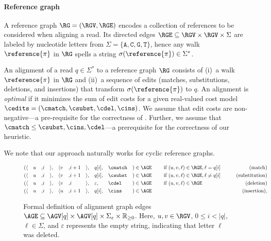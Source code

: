 \paragraph{Reference graph}
%
A reference graph $\RG=(\RGV,\RGE)$ encodes a collection of references to be
considered when aligning a read. Its directed edges $\RGE \subseteq \RGV \times
\RGV \times \Sigma$ are labeled by nucleotide letters from $\Sigma =
\{\texttt{A},\texttt{C},\texttt{G},\texttt{T}\}$, hence any walk
$\reference{\pi}$ in $\RG$ spells a string $\sigma(\reference{\pi}) \in
\Sigma^*$.

An alignment of a read $q \in \Sigma^*$ to a reference graph $\RG$ consists of
(i)~a walk $\reference{\pi}$ in $\RG$ and (ii)~a sequence of edits (matches,
substitutions, deletions, and insertions) that transform
$\sigma(\reference{\pi})$ to $q$. An alignment is \emph{optimal} if it minimizes
the sum of edit costs for a given real-valued cost model $\cedits = (\cmatch,
\csubst,\cdel, \cins)$.
%
We assume that edit costs are non-negative---a pre-requisite for the correctness
of \A. Further, we assume that $\cmatch \leq \csubst, \cins, \cdel$---a
prerequisite for the correctness of our heuristic.

We note that our approach naturally works for cyclic reference graphs.

\begin{figure}[H]
	\begin{alignat*}{20}
		(
			&\langle&& u &,& i   &\rangle&,
			&\langle&  v &,& i+1 &\rangle&,
			&&q[i],
			&&\cmatch
		&)&\in \AGE
		&& \quad \text{ if } (u,v,\ell) \in \RGE, \ell = q[i] & \qquad \text{(match)}\\
		(
			&\langle&& u &,& i   &\rangle&,
			&\langle&  v &,& i+1 &\rangle&,
			&&q[i],
			&&\csubst
		&) &\in \AGE
		&& \quad \text{ if } (u,v,\ell) \in \RGE, \ell \neq q[i] & \qquad \text{(substitution)}\\
		(
			&\langle&& u &,& i &\rangle&,
			&\langle&  v &,& i &\rangle&,
			&&\varepsilon,
			&&\cdel
		&) &\in \AGE
		&& \quad \text{ if } (u,v,\ell) \in \RGE & \qquad \text{(deletion)}\\
		(
			&\langle&& u &,& i   &\rangle&,
			&\langle&  u &,& i+1 &\rangle&,
			&&q[i],
			&&\cins
		&) &\in \AGE
		&& \quad & \qquad \text{(insertion)},
	\end{alignat*}
	\caption[Formal definition of alignment graph]{Formal definition of
	alignment graph edges $\AGE \subseteq \AGV[q] \times \AGV[q] \times
	\Sigma_\varepsilon \times \mathbb{R}_{\geq 0}$. Here, $u,v \in \RGV$, $0
	\leq i < |q|$, $\ell \in \Sigma$, and $\varepsilon$ represents the empty
	string, indicating that letter $\ell$ was deleted.}
	\label{SEEDfig:graph-edges}
\end{figure}

